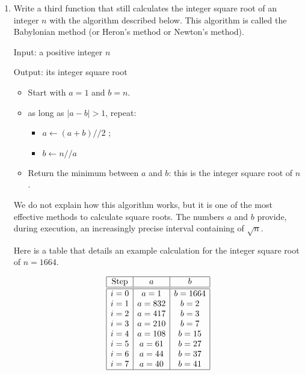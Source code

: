 \documentclass[11pt,class=report,crop=false]{standalone}
\begin{document}
\begin{activite}
\begin{enumerate}
  \item Write a third function that still calculates the integer square root of an integer $n$ with the algorithm described below. This algorithm is called the Babylonian method (or Heron's method or Newton's method).
  
    \begin{algorithme}
  Input: a positive integer $n$

  Output: its integer square root

  \begin{itemize}
    \item Start with $a=1$ and $b=n$.
    
    \item as long as $|a-b| > 1$, repeat:
    \begin{itemize} 
     \item $a \leftarrow (a+b)//2$ ;
     \item $b \leftarrow n // a$ 
    \end{itemize}          
         
    \item Return the minimum between $a$ and $b$: this is the integer square root of $n$.
  \end{itemize} 
           
 \end{algorithme}
 
 
  We do not explain how this algorithm works, but it is one of the most effective methods to calculate square roots. The numbers $a$ and $b$ provide, during execution, an increasingly precise interval containing of $\sqrt{n}$. 
  
  Here is a table that details an example calculation for the integer square root of $n=1664$.

  \medskip
  
$$\begin{array}{|c|c|c|} 
\hline
\text{Step} & a & b \\ \hline\hline
i = 0  &  a =  1    &  b =  1664 \\
i = 1  &  a =  832  &  b =  2 \\
i = 2  &  a =  417  &  b =  3 \\
i = 3  &  a =  210  &  b =  7 \\
i = 4  &  a =  108  &  b =  15 \\
i = 5  &  a =  61   &  b =  27 \\
i = 6  &  a =  44   &  b =  37 \\
i = 7  &  a =  40   &  b =  41 \\ \hline
\end{array}$$


\end{enumerate}
\end{activite}
\end{document}
